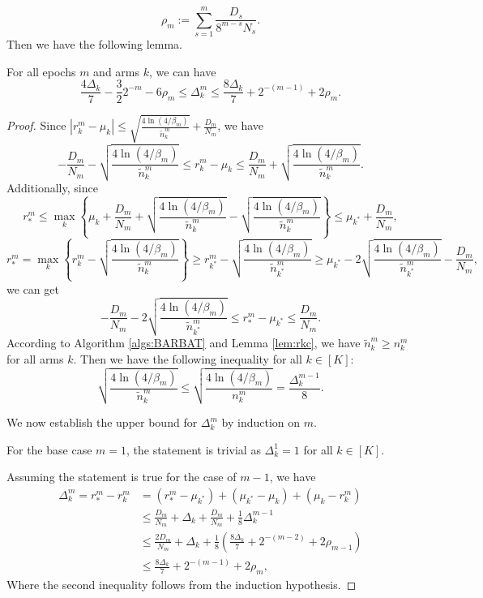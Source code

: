\[\rho_m := \sum_{s=1}^m \frac{D_s}{8^{m-s}N_s}.\]
Then we have the following lemma.
\begin{lemma}
\label{lem:bsg} %
    For all epochs $m$ and arms $k$, we can have
    \[\frac{4\Delta_k}{7} - \frac{3}{2}2^{-m} - 6 \rho_m \leq \Delta_k^{m} \leq \frac{8 \Delta_k}{7} + 2^{-(m-1)} + 2\rho_m.\]
\end{lemma}
\begin{proof}
    Since $|r_k^m - \mu_k| \leq \sqrt{\frac{4\ln(4 /\beta_m)}{\widetilde{n}_k^m}} + \frac{D_m}{N_m}$, we have
    \[-\frac{D_m}{N_m} - \sqrt{\frac{4\ln(4 /\beta_m)}{\widetilde{n}_k^m}} \leq r_{k}^m - \mu_{k} \leq \frac{D_m}{N_m} + \sqrt{\frac{4\ln(4 /\beta_m)}{\widetilde{n}_k^m}}.\]
    Additionally, since
    \[r_{*}^m \leq \max_k \left\{\mu_{k} + \frac{D_m}{N_m} + \sqrt{\frac{4\ln(4 /\beta_m)}{\widetilde{n}_k^m}} - \sqrt{\frac{4\ln(4 /\beta_m)}{\widetilde{n}_k^m}}\right\} \leq \mu_{k^*} + \frac{D_m}{N_m},\]
    \[r_{*}^m = \max_k \left\{r_k^m - \sqrt{\frac{4\ln(4 /\beta_m)}{\widetilde{n}_k^m}}\right\} \geq r_{k^*}^m - \sqrt{\frac{4\ln(4 /\beta_m)}{\widetilde{n}_{k^*}^m}} \geq \mu_{k^*} - 2\sqrt{\frac{4\ln(4 /\beta_m)}{\widetilde{n}_{k^*}^m}} - \frac{D_m}{N_m},\]
    we can get
    \[-\frac{D_m}{N_m} - 2\sqrt{\frac{4\ln(4 /\beta_m)}{\widetilde{n}_{k^*}^m}} \leq r_{*}^m - \mu_{k^*} \leq \frac{D_m}{N_m}.\]
    According to Algorithm \ref{algs:BARBAT} and Lemma \ref{lem:rkc}, we have $\widetilde{n}_k^m \geq n_k^m$ for all arms $k$. Then we have the following inequality for all $k\in [K]$:
    \[\sqrt{\frac{4\ln(4 /\beta_m)}{\widetilde{n}_k^m}} \leq \sqrt{\frac{4\ln(4 /\beta_m)}{n_k^m}} = \frac{\Delta_k^{m-1}}{8}.\]

    We now establish the upper bound for $\Delta_k^m$ by induction on $m$.
    
    For the base case $m = 1$, the statement is trivial as $\Delta_k^1 = 1$ for all $k \in [K]$.
    
    Assuming the statement is true for the case of $m-1$, we have
    \begin{equation*}
    \begin{split}
        \Delta_k^m = r_*^m - r_k^m
        &= (r_*^m - \mu_{k^*}) + (\mu_{k^*} - \mu_k) + (\mu_k - r_k^m) \\
        &\leq \frac{D_m}{N_m}+ \Delta_k + \frac{D_m}{N_m} + \frac{1}{8}\Delta_k^{m-1} \\
        &\leq \frac{2D_m}{N_m} + \Delta_k + \frac{1}{8}\left(\frac{8 \Delta_k}{7} + 2^{-(m-2)} + 2\rho_{m-1}\right) \\
        &\leq \frac{8 \Delta_k}{7} + 2^{-(m-1)} + 2\rho_m,
    \end{split}
    \end{equation*}
    Where the second inequality follows from the induction hypothesis.
     

\end{proof}
